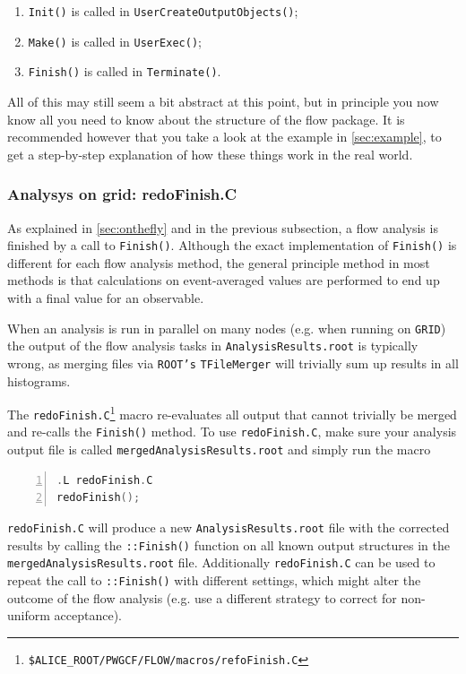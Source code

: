 \documentclass[a4paper]{book}
\numberwithin{equation}{subsection}
\begin{document}
\begin{enumerate}
\item \texttt{Init()} is called in \texttt{UserCreateOutputObjects()};
\item \texttt{Make()} is called in \texttt{UserExec()};
\item \texttt{Finish()} is called in \texttt{Terminate()}.
\end{enumerate}
All of this may still seem a bit abstract at this point, but in principle you now know all you need to know about the structure of the flow package. It is recommended however that you take a look at the example in \ref{sec:example}, to get a step-by-step explanation of how these things work in the real world.

\subsubsection{Analysys on grid: redoFinish.C}
As explained in \ref{sec:onthefly} and in the previous subsection, a flow analysis is finished by a call to \texttt{Finish()}. Although the exact implementation of \texttt{Finish()} is different for each flow analysis method, the general principle method in most methods is that calculations on event-averaged values are performed to end up with a final value for an observable. 

 When an analysis is run in parallel on many nodes (e.g. when running on \texttt{GRID}) the output of the flow analysis tasks in \texttt{AnalysisResults.root} is typically wrong, as merging files via \texttt{ROOT's} \texttt{TFileMerger} will trivially sum up results in all histograms. 

The \texttt{redoFinish.C}\footnote{\texttt{\$ALICE\_ROOT/PWGCF/FLOW/macros/refoFinish.C}} macro re-evaluates all output that cannot trivially be merged and re-calls the \texttt{Finish()} method. To use \texttt{redoFinish.C}, make sure your analysis output file is called \texttt{mergedAnalysisResults.root} and simply run the macro
\begin{lstlisting}[language=C, numbers=left]
.L redoFinish.C
redoFinish(); \end{lstlisting}
\texttt{redoFinish.C} will produce a new \texttt{AnalysisResults.root} file with the corrected results by calling the \texttt{::Finish()} function on all known output structures in the \texttt{mergedAnalysisResults.root} file. Additionally \texttt{redoFinish.C} can be used to repeat the call to \texttt{::Finish()} with different settings, which might alter the outcome of the flow analysis (e.g. use a different strategy to correct for non-uniform acceptance). 
\end{document}
